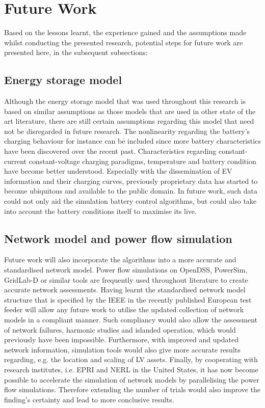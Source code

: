 \section{Future Work}
\label{ch-conclusion:future-work}

Based on the lessons learnt, the experience gained and the assumptions made whilst conducting the presented research, potential steps for future work are presented here, in the subsequent subsections:

\subsection{Energy storage model}

Although the energy storage model that was used throughout this research is based on similar assumptions as those models that are used in other state of the art literature, there are still certain assumptions regarding this model that need not be disregarded in future research.
The nonlinearity regarding the battery's charging behaviour for instance can be included since more battery characteristics have been discovered over the recent past.
Characteristics regarding constant-current constant-voltage charging paradigms, temperature and battery condition have become better understood.
Especially with the dissemination of EV information and their charging curves, previously proprietary data has started to become ubiquitous and available to the public domain.
In future work, such data could not only aid the simulation battery control algorithms, but could also take into account the battery conditions itself to maximise its live.

\subsection{Network model and power flow simulation}

Future work will also incorporate the algorithms into a more accurate and standardised network model.
Power flow simulations on OpenDSS, PowerSim, GridLab-D or similar tools are frequently used throughout literature to create accurate network assessments.
Having learnt the standardised network model structure that is specified by the IEEE in the recently published European test feeder will allow any future work to utilise the updated collection of network models in a compliant manner.
Such compliancy would also allow the assessment of network failures, harmonic studies and islanded operation, which would previously have been impossible.
Furthermore, with improved and updated network information, simulation tools would also give more accurate results regarding, e.g. the location and scaling of LV assets.
Finally, by cooperating with research institutes, i.e. EPRI and NERL in the United States, it has now become possible to accelerate the simulation of network models by parallelising the power flow simulations.
Therefore extending the number of trials would also improve the finding's certainty and lead to more conclusive results.


